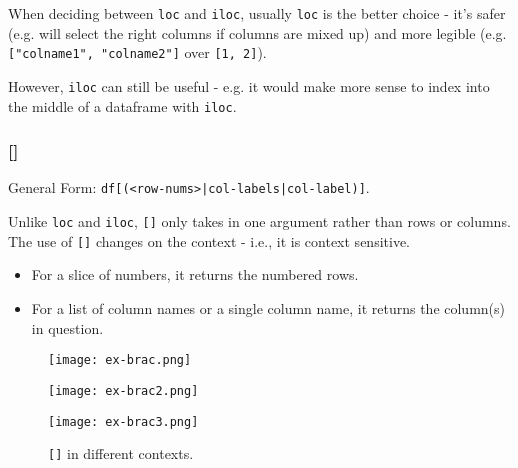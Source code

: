 \begin{notebox}
When deciding between \texttt{loc} and \texttt{iloc}, usually \texttt{loc} is the better choice - it's safer (e.g. will select the right columns if columns are mixed up) and more legible (e.g. \texttt{["colname1", "colname2"]} over \texttt{[1, 2]}).

However, \texttt{iloc} can still be useful - e.g. it would make more sense to index into the middle of a dataframe with \texttt{iloc}.
\end{notebox}

\subsubsection{[]}
General Form: \texttt{df[(<row-nums>|col-labels|col-label)]}.

Unlike \texttt{loc} and \texttt{iloc}, \texttt{[]} only takes in one argument rather than rows or columns. The use of \texttt{[]} changes on the context - i.e., it is context sensitive.
\begin{itemize}
\item For a slice of numbers, it returns the numbered rows.
\item For a list of column names or a single column name, it returns the column(s) in question.
\end{itemize}

\begin{figure}[ht]
\begin{minipage}{0.33\textwidth}
\texttt{[image: ex-brac.png]}\centering
\end{minipage}
\begin{minipage}{0.34\textwidth}
\texttt{[image: ex-brac2.png]}\centering
\end{minipage}
\begin{minipage}{0.33\textwidth}
\texttt{[image: ex-brac3.png]}\centering
\end{minipage}
\caption{\texttt{[]} in different contexts.}
\end{figure}

